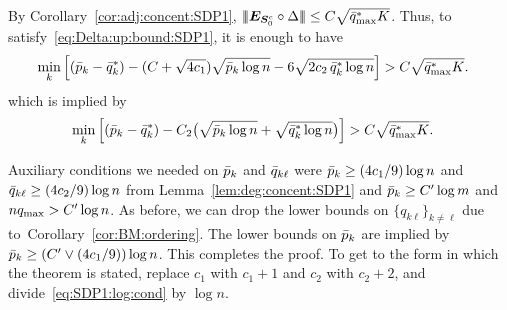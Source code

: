    By Corollary~\ref{cor:adj:concent:SDP1}, $|\!|\!|\bm{E}_{\bm{S}_0^c} \circ \Delta|\!|\!| \le C \sqrt{\bar{q}^{*}_{\max} K}$. Thus, to satisfy~\eqref{eq:Delta:up:bound:SDP1}, it is enough to have
  \begin{align*}
    \min_k \Big[  (\bar{p}_k - \bar{q}^*_k) - (C + \sqrt{4c_1}) \sqrt{\bar{p}_k \log n} - 6\sqrt{2c_2 \, \bar{q}^*_k \log n} 
    \Big] &> C \sqrt{\bar{q}^{*}_{\max} K}.
  \end{align*}
  which is implied by
  \begin{align}\label{eq:SDP1:log:cond}
  \min_k \Big[  (\bar{p}_k - \bar{q}^*_k) - C_2 \big(\sqrt{\bar{p}_k \log n} + \sqrt{\bar{q}^*_k \log n}\big) 
    \Big] &> C \sqrt{\bar{q}^{*}_{\max} K}.
  \end{align}

  Auxiliary conditions we needed on $\bar{p}_k$ and $\bar{q}_{k \ell}$ were $\bar{p}_k \ge (4c_1/9) \log n$ and $\bar{q}_{k \ell} \ge (4c_2/9) \log n$ from Lemma~\ref{lem:deg:concent:SDP1} and $\bar{p}_k \ge C' \log m$ and $n q_{\max} > C' \log n$. As before, we can drop the lower bounds on $\{q_{k\ell}\}_{k \neq \ell}$ due to~Corollary~\ref{cor:BM:ordering}. The lower bounds on $\bar{p}_k$ are implied by $\bar{p}_k \ge (C' \vee (4c_1/9)) \log n$. This completes the proof. To get to the form in which the theorem is stated, replace $c_1$ with $c_1 + 1$ and $c_2$ with $c_2 + 2$, and divide~\eqref{eq:SDP1:log:cond} by $\log n$.










% 
% 
